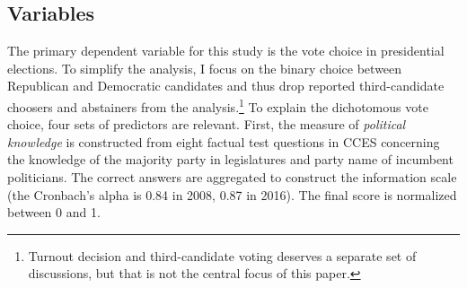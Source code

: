 \documentclass[letterpaper, 12pt]{article}
\begin{document}
    \subsection*{Variables}
    
    \par The primary dependent variable for this study is the vote choice in presidential elections. To simplify the analysis, I focus on the binary choice between Republican and Democratic candidates and thus drop reported third-candidate choosers and abstainers from the analysis.\footnote{Turnout decision and third-candidate voting deserves a separate set of discussions, but that is not the central focus of this paper.} To explain the dichotomous vote choice, four sets of predictors are relevant. First, the measure of \textit{political knowledge} is constructed from eight factual test questions in CCES concerning the knowledge of the majority party in legislatures and party name of incumbent politicians. The correct answers are aggregated to construct the information scale (the Cronbach's alpha is 0.84 in 2008, 0.87 in 2016). The final score is normalized between 0 and 1.
    
\end{document}
